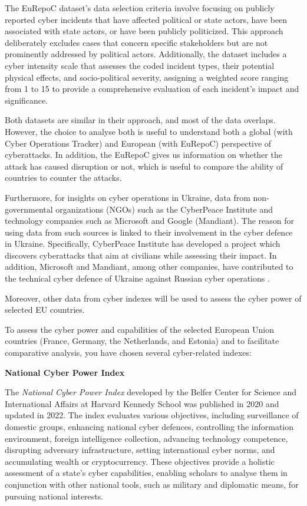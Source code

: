 The EuRepoC dataset's data selection criteria involve focusing on publicly reported cyber incidents that have affected political or state actors, have been associated with state actors, or have been publicly politicized. This approach deliberately excludes cases that concern specific stakeholders but are not prominently addressed by political actors. Additionally, the dataset includes a cyber intensity scale that assesses the coded incident types, their potential physical effects, and socio-political severity, assigning a weighted score ranging from 1 to 15 to provide a comprehensive evaluation of each incident's impact and significance.

Both datasets are similar in their approach, and most of the data overlaps. However, the choice to analyse both is useful to understand both a global (with Cyber Operations Tracker) and European (with EuRepoC) perspective of cyberattacks. In addition, the EuRepoC gives us information on whether the attack has caused disruption or not, which is useful to compare the ability of countries to counter the attacks. 

Furthermore, for insights on cyber operations in Ukraine, data from non-governmental organizations (NGOs) such as the CyberPeace Institute and technology companies such as Microsoft and Google (Mandiant). The reason for using data from such sources is linked to their involvement in the cyber defence in Ukraine. Specifically, CyberPeace Institute has developed a project which discovers cyberattacks that aim at civilians while assessing their impact. In addition, Microsoft and Mandiant, among other companies, have contributed to the technical cyber defence of Ukraine against Russian cyber operations \parencite{huntley_2023_fog, smith_2022_defending}.

Moreover, other data from cyber indexes will be used to assess the cyber power of selected EU countries. 




To assess the cyber power and capabilities of the selected European Union countries (France, Germany, the Netherlands, and Estonia) and to facilitate comparative analysis, you have chosen several cyber-related indexes:


\textbf{National Cyber Power Index}

The \textit{National Cyber Power Index} developed by the Belfer Center for Science and International Affairs at Harvard Kennedy School was published in 2020 and updated in 2022. The index evaluates various objectives, including surveillance of domestic groups, enhancing national cyber defences, controlling the information environment, foreign intelligence collection, advancing technology competence, disrupting adversary infrastructure, setting international cyber norms, and accumulating wealth or cryptocurrency. These objectives provide a holistic assessment of a state's cyber capabilities, enabling scholars to analyse them in conjunction with other national tools, such as military and diplomatic means, for pursuing national interests. 


